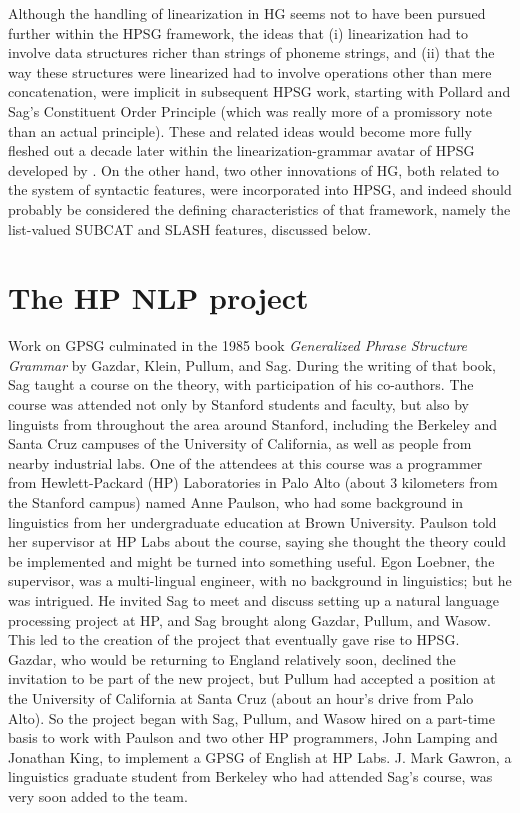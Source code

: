 \documentclass[output=paper]{langsci/langscibook}
\begin{document}
Although the handling of linearization in HG seems not to have been pursued further within the HPSG framework, the ideas that (i) linearization had to involve data structures richer than strings of phoneme strings, and (ii) that the way these structures were linearized had to involve operations other than mere concatenation, were implicit in subsequent HPSG work, starting with Pollard and Sag's Constituent Order Principle (which was really more of a promissory note than an actual principle).  These and related ideas would become more fully fleshed out a decade later within the linearization-grammar avatar of HPSG developed by \citet{Kathol95a}. On the other hand, two other innovations of HG, both related to the system of syntactic features, were incorporated into HPSG, and indeed should probably be considered the defining characteristics of that framework, namely the list-valued SUBCAT and SLASH features, discussed below.


\section{The HP NLP project}

Work on GPSG culminated in the 1985 book {\it Generalized Phrase Structure Grammar} by Gazdar,  Klein, Pullum, and Sag.  During the writing of that book, Sag taught a course on the theory, with participation of his co-authors.  The course was attended not only by Stanford students and faculty, but also by linguists from throughout the area around Stanford, including the Berkeley and Santa Cruz campuses of the University of California, as well as people from nearby industrial labs.  One of the attendees at this course was a programmer from Hewlett-Packard (HP) Laboratories in Palo Alto (about 3 kilometers from the Stanford campus) named Anne Paulson, who had some background in linguistics from her undergraduate education at Brown University.  Paulson told her supervisor at HP Labs about the course, saying she thought the theory could be implemented and might be turned into something useful.  Egon Loebner, the supervisor, was a multi-lingual engineer, with no background in linguistics; but he was intrigued.  He invited Sag to meet and discuss setting up a natural language processing project at HP, and Sag brought along Gazdar, Pullum, and Wasow.   This led to the creation of the project that eventually gave rise to HPSG.  Gazdar, who would be returning to England relatively soon, declined the invitation to be part of the new project, but Pullum had accepted a position at the University of California at Santa Cruz (about an hour's drive from Palo Alto).  So the project began with Sag, Pullum, and Wasow hired on a part-time basis to work with Paulson and two other HP programmers, John Lamping and Jonathan King, to implement a GPSG of English at HP Labs.  J. Mark Gawron, a linguistics graduate student from Berkeley who had attended Sag's course, was very soon added to the team.
\end{document}
